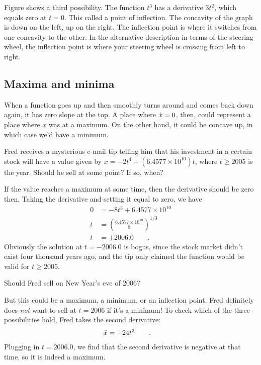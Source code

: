 
Figure  shows a third possibility. The function $t^3$ has a derivative $3t^2$, which equals
zero at $t=0$. This called a point of inflection. The concavity of the graph is down on the left, up on the right.
The inflection point is where it switches from one concavity to the other. In the alternative description in
terms of the steering wheel, the inflection point is where your steering wheel is crossing from left to right.\label{inflection}

\subsection{Maxima and minima}

When a function goes up and then smoothly turns around and comes back down again,
it has zero slope at the top. A place where $\dot{x}=0$, then, could represent
a place where $x$ was at a maximum. On the other hand, it could be concave up,
in which case we'd have a minimum.

\begin{eg}
\egquestion Fred receives a mysterious e-mail tip telling him that his investment in a certain stock will
have a value given by $x=-2t^4+(6.4577\times10^{10})t$, where $t\ge 2005$ is the year. Should he sell at some point? If so, when?

\eganswer If the value reaches a maximum at some time, then the derivative should be zero then. Taking the
derivative and setting it equal to zero, we have
\begin{align*}
  0 &= -8t^3+6.4577\times10^{10}\\
  t &= \left(\frac{6.4577\times10^{10}}{8}\right)^{1/3} \\
  t &= \pm 2006.0 \qquad .
\end{align*}
Obviously the solution at $t=-2006.0$ is bogus, since the stock market didn't exist four thousand years ago, and
the tip only claimed the function would be valid for $t\ge 2005$.

Should Fred sell on New Year's eve of 2006?

But this could be a maximum, a minimum, or an inflection point. Fred definitely does \emph{not} want to
sell at $t=2006$ if it's a minimum! To check which of the three possibilities hold, Fred takes the
second derivative:
\begin{align*}
 \Ddot{x} &= -24t^2 \qquad .
\end{align*}
Plugging in $t=2006.0$, we find that the second derivative is negative at that time, so it is indeed a
maximum.
\end{eg}

